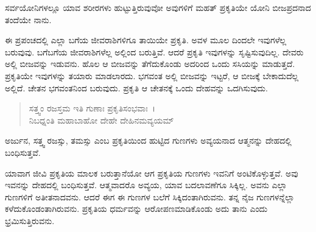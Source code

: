 {\small ಸರ್ವಯೋನಿಗಳಲ್ಲೂ ಯಾವ ಶರೀರಗಳು ಹುಟ್ಟುತ್ತಿರುವುವೋ ಅವುಗಳಿಗೆ ಮಹತ್ ಪ್ರಕೃತಿಯೇ ಯೋನಿ ಬೀಜಪ್ರದನಾದ ತಂದೆಯೇ ನಾನು.}

ಈ ಪ್ರಪಂಚದಲ್ಲಿ ಎಲ್ಲಾ ಬಗೆಯ ಜೀವರಾಶಿಗಳಿಗೂ ತಾಯಿಯೇ ಪ್ರಕೃತಿ. ಅವಳ ಮೂಲ ದಿಂದಲೇ ಇವುಗಳೆಲ್ಲ ಬರುವುವು. ಬಗೆಬಗೆಯ ಜೀವರಾಶಿಗಳೆಲ್ಲ ಅಲ್ಲಿಂದ ಬರುತ್ತಿವೆ. ಆದರೆ ಪ್ರಕೃತಿ ಇವುಗಳನ್ನು ಸೃಷ್ಟಿಸುವುದಿಲ್ಲ. ದೇವರು ಅಲ್ಲಿ ಬೀಜವನ್ನು ಇಡುವನು. ಹೊಲ ಆ ಬೀಜವನ್ನು ತೆಗೆದುಕೊಂಡು ಅದರಿಂದ ಒಂದು ಸಸಿಯನ್ನು ಮಾಡುತ್ತದೆ. ಪ್ರಕೃತಿಯೇ ಇವುಗಳನ್ನು ತಯಾರು ಮಾಡಲಾರದು. ಭಗವಂತ ಅಲ್ಲಿ ಬೀಜವನ್ನು ಇಟ್ಟರೆ, ಆ ಬೀಜಕ್ಕೆ ಬೇಕಾದುದೆಲ್ಲ ಅಲ್ಲಿದೆ. ಚೇತನ ಭಗವಂತನಿಂದ ಬರುವುದು. ಪ್ರಕೃತಿ ಆ ಚೇತನಕ್ಕೆ ಒಂದು ದೇಹವನ್ನು ಒದಗಿಸುವುದು.

\begin{verse}
ಸತ್ತ್ವಂ ರಜಸ್ತಮ ಇತಿ ಗುಣಾಃ ಪ್ರಕೃತಿಸಂಭವಾಃ~।\\ನಿಬಧ್ನಂತಿ ಮಹಾಬಾಹೋ ದೇಹೇ ದೇಹಿನಮವ್ಯಯಮ್ 
\end{verse}

{\small ಅರ್ಜುನ, ಸತ್ತ್ವ ರಜಸ್ಸು, ತಮಸ್ಸು ಎಂಬ ಪ್ರಕೃತಿಯಿಂದ ಹುಟ್ಟಿದ ಗುಣಗಳು ಅವ್ಯಯನಾದ ಆತ್ಮನನ್ನು ದೇಹದಲ್ಲಿ ಬಂಧಿಸುತ್ತವೆ.}

ಯಾವಾಗ ಜೀವಿ ಪ್ರಕೃತಿಯ ಮಾಲಕ ಬರುತ್ತಾನೆಯೋ ಆಗ ಪ್ರಕೃತಿಯ ಗುಣಗಳು ಇವನಿಗೆ ಅಂಟಿಕೊಳ್ಳುತ್ತವೆ. ಅವು ಇವನನ್ನು ದೇಹದಲ್ಲಿ ಬಂಧಿಸುತ್ತವೆ. ಆತ್ಮವಾದರೊ ಅವ್ಯಯ, ಯಾವ ಬದಲಾವಣೆಗೂ ಸಿಕ್ಕಿಲ್ಲ. ಅವನು ಎಲ್ಲಾ ಗುಣಗಳಿಗೆ ಅತೀತನಾದವನು. ಆದರೆ ಈಗ ಈ ಗುಣಗಳ ಬಲೆಗೆ ಸಿಕ್ಕಿದಂತಾಗಿರುವನು. ತನ್ನ ನೈಜ ಗುಣಗಳನ್ನೆಲ್ಲಾ ಕಳೆದುಕೊಂಡಂತಾಗಿರುವನು. ಪ್ರಕೃತಿಯ ಧರ್ಮವನ್ನು ಆರೋಪಣಮಾಡಿಕೊಂಡು ಅದು ತಾನು ಎಂದು ಭ್ರಮಿಸುತ್ತಿರುವನು.

